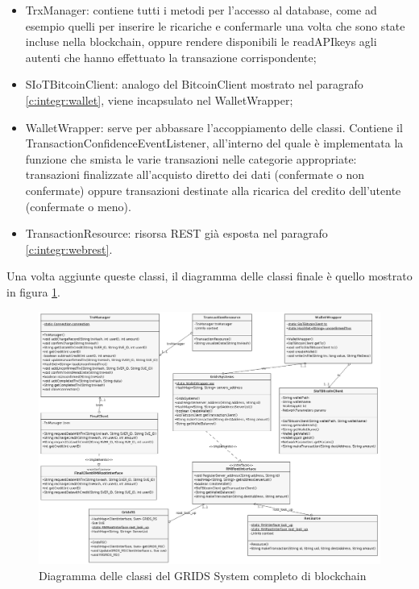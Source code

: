 \begin{itemize}
    \item TrxManager: contiene tutti i metodi per l'accesso al database, come ad esempio quelli per inserire le ricariche e confermarle una volta che sono state incluse nella blockchain, oppure rendere disponibili le readAPIkeys agli autenti che hanno effettuato la transazione corrispondente;
    \item SIoTBitcoinClient: analogo del BitcoinClient mostrato nel paragrafo \ref{c:integr:wallet}, viene incapsulato nel WalletWrapper;
    \item WalletWrapper: serve per abbassare l'accoppiamento delle classi. Contiene il TransactionConfidenceEventListener, all'interno del quale è implementata la funzione che smista le varie transazioni nelle categorie appropriate: transazioni finalizzate all'acquisto diretto dei dati (confermate o non confermate) oppure transazioni destinate alla ricarica del credito dell'utente (confermate o meno).
    \item TransactionResource: risorsa REST già esposta nel paragrafo \ref{c:integr:webrest}.
\end{itemize}


Una volta aggiunte queste classi, il diagramma delle classi finale è quello mostrato in figura \ref{f:integr:diagrammafinale}.

\begin{figure}[h!t]
\centerline{\includegraphics[width=\textwidth]{img/finalModelCorrect}}
\caption{Diagramma delle classi del GRIDS System completo di blockchain}
\label{f:integr:diagrammafinale}
\end{figure}

